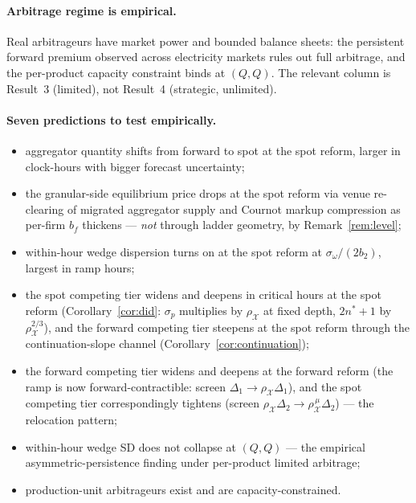 \documentclass[11pt,a4paper]{article}
\theoremstyle{definition}
\theoremstyle{remark}
\theoremstyle{plain}
\begin{document}
\paragraph{Arbitrage regime is empirical.} Real arbitrageurs have market power and bounded balance sheets: the persistent forward premium observed across electricity markets rules out full arbitrage, and the per-product capacity constraint binds at $(Q,Q)$. The relevant \citeauthor{ito_reguant_2016} column is Result~3 (limited), not Result~4 (strategic, unlimited).

\paragraph{Seven predictions to test empirically.}
\begin{itemize}
\item[(P1)] aggregator quantity shifts from forward to spot at the spot reform, larger in clock-hours with bigger forecast uncertainty;
\item[(P2)] the granular-side equilibrium price drops at the spot reform via venue re-clearing of migrated aggregator supply and Cournot markup compression as per-firm $b_f$ thickens --- \emph{not} through ladder geometry, by Remark~\ref{rem:level};
\item[(P3)] within-hour wedge dispersion turns on at the spot reform at $\sigma_\omega/(2 b_2)$, largest in ramp hours;
\item[(P4)] the spot competing tier widens and deepens in critical hours at the spot reform (Corollary~\ref{cor:did}: $\sigma_p$ multiplies by $\rho_{\mathcal X}$ at fixed depth, $2n^*+1$ by $\rho_{\mathcal X}^{2/3}$), and the forward competing tier steepens at the spot reform through the continuation-slope channel (Corollary~\ref{cor:continuation});
\item[(P5)] the forward competing tier widens and deepens at the forward reform (the ramp is now forward-contractible: screen $\Delta_1 \to \rho_{\mathcal X}\Delta_1$), and the spot competing tier correspondingly tightens (screen $\rho_{\mathcal X}\Delta_2 \to \rho^{\,\mu}_{\mathcal X}\Delta_2$) --- the relocation pattern;
\item[(P6)] within-hour wedge SD does not collapse at $(Q,Q)$ --- the empirical asymmetric-persistence finding under per-product limited arbitrage;
\item[(P7)] production-unit arbitrageurs exist and are capacity-constrained.
\end{itemize}
\end{document}

